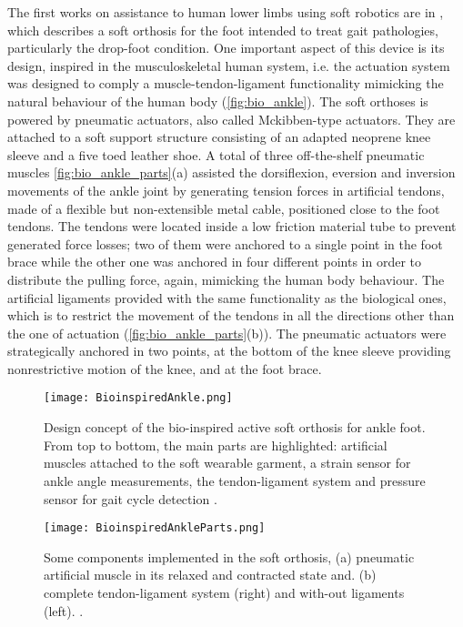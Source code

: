 The first works on assistance to human lower limbs using soft robotics are in \cite{park2011bio,Hamedi2015}, which describes a soft orthosis for the foot intended to treat gait pathologies, particularly the drop-foot condition. One important aspect of this device is its design, inspired in the musculoskeletal human system, i.e. the actuation system was designed to comply a muscle-tendon-ligament functionality mimicking the natural behaviour of the human body (\autoref{fig:bio_ankle}). The soft orthoses is powered by pneumatic actuators, also called Mckibben-type actuators. They are attached to a soft support structure consisting of an adapted neoprene knee sleeve and a five toed leather shoe. A total of three off-the-shelf pneumatic muscles \autoref{fig:bio_ankle_parts}(a) assisted the dorsiflexion, eversion and inversion movements of the ankle joint by generating tension forces in artificial tendons, made of a flexible but non-extensible metal cable, positioned close to the foot tendons. The tendons were located inside a low friction material tube to prevent generated force losses; two of them were anchored to a single point in the foot brace while the other one was anchored in four different points in order to distribute the pulling force, again, mimicking the human body behaviour. The artificial ligaments provided with the same functionality as the biological ones, which is to restrict the movement of the tendons in all the directions other than the one of actuation (\autoref{fig:bio_ankle_parts}(b)). The pneumatic actuators were strategically anchored in two points, at the bottom of the knee sleeve providing nonrestrictive motion of the knee, and at the foot brace.
\begin{figure}[hbtp!]
    \centering
    \texttt{[image: BioinspiredAnkle.png]}
    \caption{Design concept of the bio-inspired active soft orthosis for ankle foot. From top to bottom, the main parts are highlighted: artificial muscles attached to the soft wearable garment, a strain sensor for ankle angle measurements, the tendon-ligament system and pressure sensor for gait cycle detection \cite{park2011bio}. }
    \label{fig:bio_ankle}
\end{figure}
\begin{figure}[hbtp!]
    \centering
    \texttt{[image: BioinspiredAnkleParts.png]}
    \caption{Some components implemented in the soft orthosis, (a) pneumatic artificial muscle in its relaxed and contracted state and. (b) complete tendon-ligament system (right) and with-out ligaments (left). \cite{park2011bio}. }
    \label{fig:bio_ankle_parts}
\end{figure}

